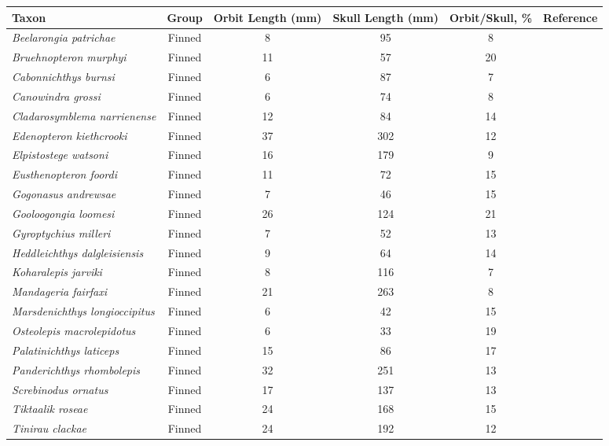 \begin{tabular}{|L{4.5cm}|c|c|c|c|L{4.5cm}|}
\hline
\textbf{Taxon}&\textbf{Group}&\textbf{Orbit Length (mm)}&\textbf{Skull Length (mm)}&\textbf{Orbit/Skull, \%}&\textbf{Reference}\\\hline
\textit{Beelarongia patrichae}&Finned&8&95&8 &\\\hline
\textit{Bruehnopteron  murphyi}&Finned&11&57&20&\\\hline
\textit{Cabonnichthys burnsi}&Finned&6&87&7 &\\\hline
\textit{Canowindra grossi}&Finned&6&74&8 &\\\hline
\textit{Cladarosymblema narrienense}&Finned&12&84&14&\\\hline
\textit{Edenopteron kiethcrooki}&Finned&37&302&12&\\\hline
\textit{Elpistostege watsoni}&Finned&16&179&9 &\\\hline
\textit{Eusthenopteron foordi}&Finned&11&72&15&\\\hline
\textit{Gogonasus andrewsae}&Finned&7&46&15&\\\hline
\textit{Gooloogongia loomesi}&Finned&26&124&21&\\\hline
\textit{Gyroptychius  milleri}&Finned&7&52&13&\\\hline
\textit{Heddleichthys dalgleisiensis}&Finned&9&64&14&\\\hline
\textit{Koharalepis jarviki}&Finned&8&116&7 &\\\hline
\textit{Mandageria fairfaxi}&Finned&21&263&8 &\\\hline
\textit{Marsdenichthys longioccipitus}&Finned&6&42&15&\\\hline
\textit{Osteolepis macrolepidotus}&Finned&6&33&19&\\\hline
\textit{Palatinichthys laticeps}&Finned&15&86&17&\\\hline
\textit{Panderichthys rhombolepis}&Finned&32&251&13&\\\hline
\textit{Screbinodus ornatus}&Finned&17&137&13&\\\hline
\textit{Tiktaalik roseae}&Finned&24&168&15&\\\hline
\textit{Tinirau clackae}&Finned&24&192&12&\\\hline

\end{tabular}
